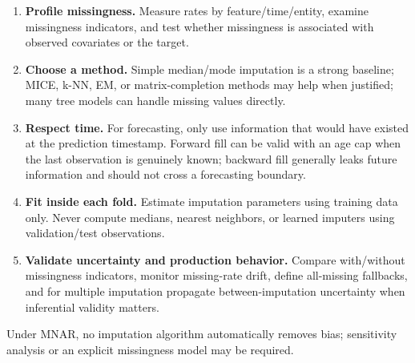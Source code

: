 \documentclass[11pt,letterpaper,openany]{book}
\begin{document}
\begin{enumerate}
\item \textbf{Profile missingness.} Measure rates by feature/time/entity, examine missingness indicators, and test whether missingness is associated with observed covariates or the target.
\item \textbf{Choose a method.} Simple median/mode imputation is a strong baseline; MICE, k-NN, EM, or matrix-completion methods may help when justified; many tree models can handle missing values directly.
\item \textbf{Respect time.} For forecasting, only use information that would have existed at the prediction timestamp. Forward fill can be valid with an age cap when the last observation is genuinely known; backward fill generally leaks future information and should not cross a forecasting boundary.
\item \textbf{Fit inside each fold.} Estimate imputation parameters using training data only. Never compute medians, nearest neighbors, or learned imputers using validation/test observations.
\item \textbf{Validate uncertainty and production behavior.} Compare with/without missingness indicators, monitor missing-rate drift, define all-missing fallbacks, and for multiple imputation propagate between-imputation uncertainty when inferential validity matters.
\end{enumerate}
Under MNAR, no imputation algorithm automatically removes bias; sensitivity analysis or an explicit missingness model may be required.
\end{document}
